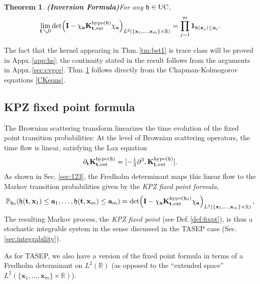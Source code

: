 \documentclass[letterpaper,reqno,11pt,oneside,final]{amsart}
\newtheorem{theorem}[thm]{Theorem}
\theoremstyle{definition}
\newcommand{\fh}{\mathfrak{h}}
\newcommand{\pp}{\mathbb{P}}
\newcommand{\rr}{\mathbb{R}}
\newcommand{\uno}[1]{\mathbf{1}_{#1}}
\newcommand{\uptext}[1]{\text{\upshape{#1}}}
\DeclareMathOperator{\hypo}{\uptext{hypo}}
\DeclareMathOperator{\UC}{\uptext{UC}}
\newcommand{\ft}{\mathbf{t}}
\newcommand{\fx}{\mathbf{x}}
\newcommand{\fa}{\mathbf{a}}
\newcommand{\fK}{\mathbf{K}}
\newcommand{\fI}{\mathbf{I}}
\numberwithin{equation}{section}
\begin{document}
\begin{theorem}{\bf (Inversion Formula)}\label{tm:bst2}
\enspace For any $\fh \in \UC$,
\begin{equation}
\lim_{\ft\searrow 0}\det\!\left(\fI-\chi_{\fa}\fK^{\hypo(\fh)}_{\ft,\uptext{ext}}\chi_{\fa}\right)_{L^2(\{\fx_1,\dotsc,\fx_m\} \times\rr)} = \prod_{j=1}^m\uno{\fh(\fx_j)\le \fa_j}.
\end{equation} 
\end{theorem}

The fact that the kernel appearing in Thm.\,\ref{tm:bst1} is trace class will be proved in Appx.\,\ref{app:hs}; the continuity stated in the result follows from the arguments in Appx.\,\ref{sec:cvgce}.
Thm.\,\ref{tm:bst2} follows directly from the Chapman-Kolmogorov equations \eqref{CKeqns}. 

\subsection{KPZ fixed point formula}\label{sec:fixedpt}

The Brownian scattering transform linearizes the time evolution of the fixed point transition probabilities:
At the level of Brownian scattering operators, the time flow is linear, satisfying the Lax equation
\begin{equation}
\partial_\ft \fK^{\hypo(\fh)}_{\ft,\uptext{ext}}= [ -\tfrac13 \partial^3, \fK^{\hypo(\fh)}_{\ft,\uptext{ext}}].\label{eq:fixedpt-lax}
\end{equation}
As shown in Sec. \ref{sec:123}, the Fredholm determinant maps this linear flow to the Markov transition probabilities given by the \emph{KPZ fixed point formula},
\begin{equation}
\pp_{\fh_0}\!\left(\fh(\ft,\fx_1)\leq\fa_1,\dotsc,\fh(\ft,\fx_m)\leq\fa_m\right)
=\det\!\left(\fI-\chi_{\fa}\fK^{\hypo(\fh_0)}_{\ft,\uptext{ext}}\chi_{\fa}\right)_{L^2(\{\fx_1,\dotsc,\fx_m\}\times\rr)},\label{eq:twosided-ext}
\end{equation}
The resulting Markov process, the \emph{KPZ fixed point} (see Def.\,\ref{def:fixpt}), is thus a stochastic integrable system in the sense discussed in the TASEP case (Sec.\,\ref{sec:integrability}).

As for TASEP, we also have a version of the fixed point formula in terms of a Fredholm determinant on $L^2(\rr)$ (as opposed to the ``extended space'' $L^2(\{\fx_1,\dotsc,\fx_m\}\times\rr)$).
\end{document}
